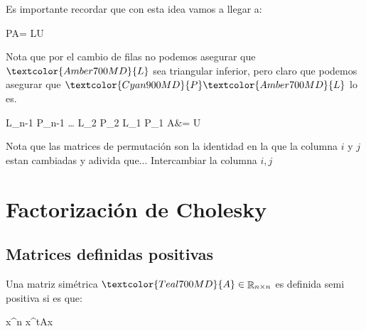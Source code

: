 \documentclass[12pt, fleqn]{report}                             %
\def \Eq {equation}                                             %
\newenvironment{MultiLineEquation*}[1]                          %
        {\begin{\Eq*}\begin{alignedat}{#1}}                         %
        {\end{alignedat}\end{\Eq*}}                                 %
\newenvironment{largeEq} {\begingroup \large}{\endgroup}        %
\DeclareMathOperator \Space     {\quad}                         %
\theoremstyle{break}                                            %
\DeclareMathOperator \Reals        {\mathbb{R}}                 %
\newcommand{\Color}[2]{\textcolor{#1}{#2}}                      %
\newcommand \ColorMatrixA       {Teal700MD}                     %
\newcommand \ColorVecX          {Green700MD}                    %
\newcommand \ColorMatrixL       {Amber700MD}                    %
\newcommand \ColorMatrixU       {Indigo700MD}                   %
\newcommand \ColorMatrixP       {Cyan900MD}                     %
\newcommand \MatrixA      {\Color{\ColorMatrixA}{A}}            %
\newcommand \VecX         {\Color{\ColorVecX}{\vec x}}          %
\newcommand \VecXT        {\Color{\ColorVecX}{\VecX^{\;t}}}     %
\newcommand \MatrixL      {\Color{\ColorMatrixL}{L}}            %
\newcommand \MatrixU      {\Color{\ColorMatrixU}{U}}            %
\newcommand \MatrixP      {\Color{\ColorMatrixP}{P}}            %
\begin{document}
            Es importante recordar que con esta idea vamos a llegar a:
            \begin{MultiLineEquation*}{3}
                \MatrixP \MatrixA = \MatrixL \MatrixU 
            \end{MultiLineEquation*}

            Nota que por el cambio de filas no podemos asegurar que $\MatrixL$ sea triangular inferior, pero claro que
            podemos asegurar que $\MatrixP \MatrixL$ lo es.
            \begin{MultiLineEquation*}{3}
                \Color{\ColorMatrixL}{\MatrixL_{n-1}}
                \Color{\ColorMatrixP}{\MatrixP_{n-1}}
                \dots
                \Color{\ColorMatrixL}{\MatrixL_{2}}
                \Color{\ColorMatrixP}{\MatrixP_{2}}
                \Color{\ColorMatrixL}{\MatrixL_{1}}
                \Color{\ColorMatrixP}{\MatrixP_{1}}
                \MatrixA &= \MatrixU
            \end{MultiLineEquation*}

            Nota que las matrices de permutación son la identidad en la que la columna $i$
            y $j$ estan cambiadas y adivida que... Intercambiar la columna $i, j$

         

    \chapter{Factorización de Cholesky}

        \clearpage
        \section{Matrices definidas positivas}

            Una matriz simétrica $\MatrixA \in \Reals_{n \times n}$ es definida
            semi positiva si es que:
            \begin{largeEq}
                \begin{MultiLineEquation*}{3}
                    \forall \VecX \in \Reals^n 
                        \Space \VecXT \MatrixA \VecX {}
                \end{MultiLineEquation*}
            \end{largeEq}
\end{document}
